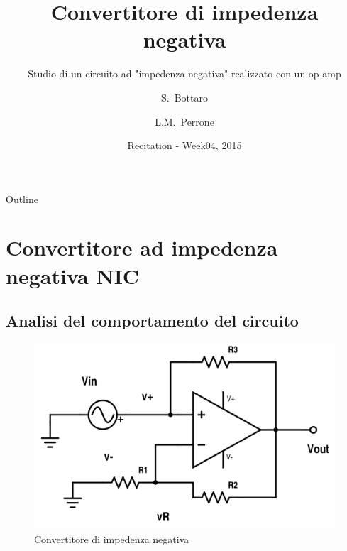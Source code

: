 \documentclass{beamer}
\title{Convertitore di impedenza negativa}
\subtitle{Studio di un circuito ad "impedenza negativa" realizzato con un op-amp}
\author{S.~Bottaro\inst{1} \and L.M.~Perrone\inst{1}}
\institute[Unipi] %
{
  \inst{1}%
  Dipartimento di Fisica\\
  Universita' di Pisa
}
\date{Recitation - Week04, 2015}
\begin{document}
\begin{frame}
  \titlepage
\end{frame}

\begin{frame}{Outline}
  \tableofcontents
\end{frame}

\section{Convertitore ad impedenza negativa NIC}

\subsection{Analisi del comportamento del circuito}

\begin{frame}

{
\centering
\begin{figure}
\centering
\includegraphics[width=1\linewidth]{./conv-imp-neg}
\caption{Convertitore di impedenza negativa}
\label{fig:conv-imp-neg}
\end{figure}



}

\end{frame}
\end{document}

